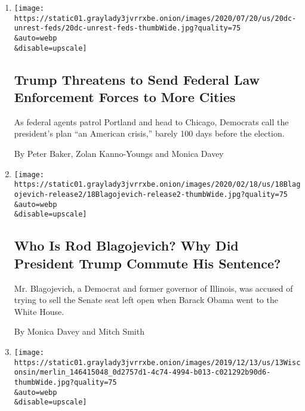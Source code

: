 \begin{enumerate}
\def\labelenumi{\arabic{enumi}.}
\item
  \href{/2020/07/20/us/politics/trump-chicago-portland-federal-agents.html}{}

  \texttt{[image: https://static01.graylady3jvrrxbe.onion/images/2020/07/20/us/20dc-unrest-feds/20dc-unrest-feds-thumbWide.jpg?quality=75\\\&auto=webp\\\&disable=upscale]}

  \hypertarget{trump-threatens-to-send-federal-law-enforcement-forces-to-more-cities}{%
  \subsection{Trump Threatens to Send Federal Law Enforcement Forces to
  More
  Cities}\label{trump-threatens-to-send-federal-law-enforcement-forces-to-more-cities}}

  As federal agents patrol Portland and head to Chicago, Democrats call
  the president's plan ``an American crisis,'' barely 100 days before
  the election.

  By Peter Baker, Zolan Kanno-Youngs and Monica Davey
\item
  \href{/2020/02/18/us/rod-blagojevich-sentence.html}{}

  \texttt{[image: https://static01.graylady3jvrrxbe.onion/images/2020/02/18/us/18Blagojevich-release2/18Blagojevich-release2-thumbWide.jpg?quality=75\\\&auto=webp\\\&disable=upscale]}

  \hypertarget{who-is-rod-blagojevich-why-did-president-trump-commute-his-sentence}{%
  \subsection{Who Is Rod Blagojevich? Why Did President Trump Commute
  His
  Sentence?}\label{who-is-rod-blagojevich-why-did-president-trump-commute-his-sentence}}

  Mr. Blagojevich, a Democrat and former governor of Illinois, was
  accused of trying to sell the Senate seat left open when Barack Obama
  went to the White House.

  By Monica Davey and Mitch Smith
\item
  \href{/2019/12/13/us/wisconsin-voter-rolls-purge.html}{}

  \texttt{[image: https://static01.graylady3jvrrxbe.onion/images/2019/12/13/us/13Wisconsin/merlin\_146415048\_0d2757d1-4c74-4994-b013-c021292b90d6-thumbWide.jpg?quality=75\\\&auto=webp\\\&disable=upscale]}


\end{enumerate}
